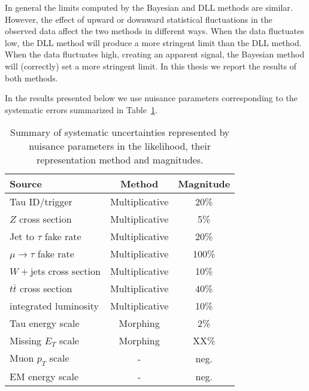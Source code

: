 In general the limits computed by the Bayesian and DLL methods are similar.
However, the effect of upward or downward statistical fluctuations in the
observed data affect the two methods in different ways.  When the data
fluctuates low, the DLL method will produce a more stringent limit than the
DLL method.  When the data fluctuates high, creating an apparent signal, the
Bayesian method will (correctly) set a more stringent limit.  In this thesis we
report the results of both methods.
%

In the results presented below we use nuisance parameters corresponding
to the systematic errors summarized in Table~\ref{tab-sys}.

\begin{table}
  \begin{center}
    \begin{tabular}{|l|c|c|} \hline
  Source                 &       Method      &   Magnitude  \\ \hline
Tau ID/trigger           &  Multiplicative   &    20\%      \\
$Z$ cross section        &  Multiplicative   &     5\%      \\
Jet to $\tau$ fake rate  &  Multiplicative   &    20\%      \\
$\mu\to\tau$ fake rate   &  Multiplicative   &   100\%      \\
$W+$jets cross section   &  Multiplicative   &    10\%      \\
$t\bar{t}$ cross section &  Multiplicative   &    40\%      \\
integrated luminosity    &  Multiplicative   &    10\%      \\
Tau energy scale         &  Morphing         &     2\%      \\
Missing $E_T$ scale      &  Morphing         &     XX\%      \\
Muon $p_T$ scale         &   -               &   neg.       \\
EM energy scale          &   -               &   neg.       \\ \hline
    \end{tabular}
   \end{center}
  \caption{Summary of systematic uncertainties represented by nuisance 
           parameters in the likelihood, their representation method 
           and magnitudes.\label{tab-sys}}
\end{table}


\ifx\master\undefined\fi

